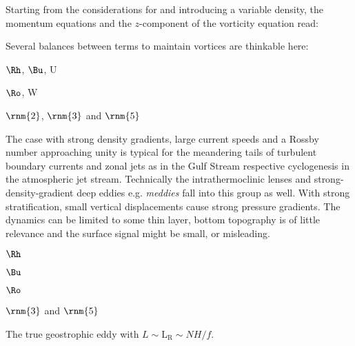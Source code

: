 \label{chap:eddy_cat}
Starting from the considerations for  and introducing a variable
density, the momentum equations and the
$z$-component of the vorticity equation read:


Several balances between terms to maintain vortices are thinkable here:




\begin{eddy}\label{eddy:FrontalLense}
\begin{description}
\item[large:]\hspace{50 pt}
 $\Rh$, $\Bu$, U
\item[small:]\hspace{50 pt}
$\Ro$, W
\item[balance between:]
$\rnm{2}$, $\rnm{3}$ and $\rnm{5}$
\end{description}
The case with strong density gradients, large current speeds and a Rossby number approaching unity is typical for the meandering tails of turbulent boundary
currents and zonal jets as in the Gulf Stream respective cyclogenesis in the atmospheric jet stream. Technically the intrathermoclinic lenses
\citep{Cushman-Roisin1990} and strong-density-gradient deep eddies e.g. \textit{meddies} fall into this group as well. With strong stratification, small
vertical displacements cause strong pressure gradients. The dynamics can be limited to some thin layer, bottom topography is of little relevance and the surface
signal might be small, or misleading.
 \end{eddy}


\begin{eddy} \label{eddy:midlat}
\begin{description}
\item[large:]\hspace{50 pt}
 $\Rh$
\item[$\mathcal{O} 1$:]\hspace{62 pt}
$\Bu$
\item[small:]\hspace{50 pt}
$\Ro$
\item[balance between:]
$\rnm{3}$ and $\rnm{5}$
\end{description}
The true geostrophic eddy with $L \sim \mathrm{L_R} \sim NH/f$.
\end{eddy}

